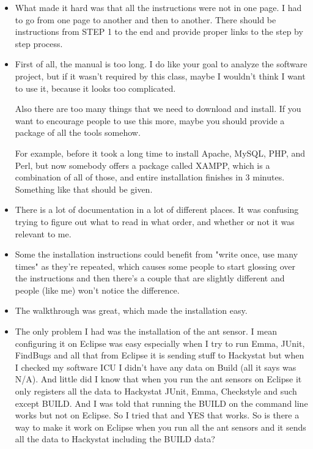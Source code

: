 \documentclass[11pt]{article}
\begin{document}
\begin{itemize}
\item What made it hard was that all the instructions were not in one page.  I had to go from one page to another and then to another.  There should be instructions from STEP 1 to the end and provide proper links to the step by step process.

\item First of all, the manual is too long. I do like your goal to analyze the software project, but if it wasn't required by this class, maybe I wouldn't think I want to use it, because it looks too complicated. 

Also there are too many things that we need to download and install. If you want to encourage people to use this more, maybe you should provide a package of all the tools somehow. 

For example, before it took a long time to install Apache, MySQL, PHP, and Perl, but now somebody offers a package called XAMPP, which is a combination of all of those, and entire installation finishes in 3 minutes. Something like that should be given. 

\item There is a lot of documentation in a lot of different places.  It was confusing trying to figure out what to read in what order, and whether or not it was relevant to me.

\item Some the installation instructions could benefit from "write once, use many times" as they're repeated, which causes some people to start glossing over the instructions and then there's a couple that are slightly different and people (like me) won't notice the difference.

\item The walkthrough was great, which made the installation easy.

\item The only problem I had was the installation of the ant sensor. I mean configuring it on Eclipse was easy especially when I try to run Emma, JUnit, FindBugs and all that from Eclipse it is sending stuff to Hackystat but when I checked my software ICU I didn't have any data on Build (all it says was N/A). And little did I know that when you run the ant sensors on Eclipse it only registers all the data to Hackystat JUnit, Emma, Checkstyle and such except BUILD. And I was told  that running the BUILD on the command line works but not on Eclipse. So I tried that and YES that works. So is there a way to make it work on Eclipse when you run all the ant sensors and it sends all the data to Hackystat including the BUILD data?


\end{itemize}
\end{document}
